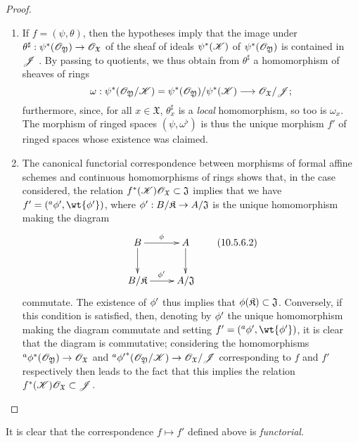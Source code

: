 \begin{proof}
\label{proof-1.10.5.6}
\medskip\noindent
\begin{enumerate}[label=(\roman*)]
  \item If $f=(\psi,\theta)$, then the hypotheses imply that the image under $\theta^\sharp:\psi^*(\sh{O}_\mathfrak{Y})\to\sh{O}_\mathfrak{X}$ of the sheaf of ideals $\psi^*(\mathscr{K})$ of $\psi^*(\mathscr{O}_\mathfrak{Y})$ is contained in $\mathscr{J}$ .
    By passing to quotients, we thus obtain from $\theta^\sharp$ a homomorphism of sheaves of rings
    \[
      \omega:\psi^*(\sh{O}_\mathfrak{Y}/\sh{K})=\psi^*(\sh{O}_\mathfrak{Y})/\psi^*(\sh{K})\to\sh{O}_\mathfrak{X}/\sh{J};
    \]
    furthermore, since, for all $x\in\mathfrak{X}$, $\theta_x^\sharp$ is a \emph{local} homomorphism, so too is $\omega_x$.
    The morphism of ringed spaces $(\psi,\omega^\flat)$ is thus  the unique morphism $f'$ of ringed spaces whose existence was claimed.
  \item The canonical functorial correspondence between morphisms of formal affine schemes and continuous homomorphisms of rings  shows that, in the case considered, the relation $f^*(\mathscr{K})\mathscr{O}_\mathfrak{X}\subset\mathfrak{J}$ implies that we have $f'=({}^a\vphi',\wt{\vphi'})$, where $\vphi':B/\mathfrak{K}\to A/\mathfrak{J}$ is the unique homomorphism making the diagram
    \begin{equation*}
    \label{1.10.5.6.2}
      \xymatrix{
        B\ar[r]^\vphi\ar[d] &
        A\ar[d]\\
        B/\mathfrak{K}\ar[r]^{\vphi'} &
        A/\mathfrak{J}
      }
      \tag{10.5.6.2}
    \end{equation*}
    commutate.
    The existence of $\phi'$ thus implies that $\phi(\mathfrak{K})\subset\mathfrak{J}$.
    Conversely, if this condition is satisfied, then, denoting by $\phi'$ the unique homomorphism making the diagram  commutate and setting $f'=({}^a\vphi',\wt{\vphi'})$, it is clear that the diagram  is commutative; considering the homomorphisms ${}^a\vphi^*(\sh{O}_\mathfrak{Y})\to\sh{O}_\mathfrak{X}$ and ${}^a{\vphi'}^*(\sh{O}_\mathfrak{Y}/\sh{K})\to\sh{O}_\mathfrak{X}/\sh{J}$ corresponding to $f$ and $f'$ respectively then leads to the fact that this implies the relation $f^*(\mathscr{K})\mathscr{O}_\mathfrak{X}\subset\mathscr{J}$.
\end{enumerate}
\end{proof}

It is clear that the correspondence $f\mapsto f'$ defined above is \emph{functorial}.


